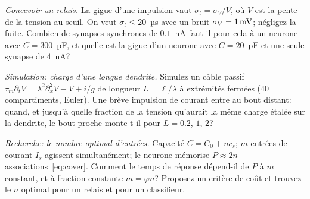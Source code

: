 \begin{exercise}[\lvlB]
\label{ex:19:5}
\emph{Concevoir un relais.} La gigue d'une impulsion vaut $\sigma_t=\sigma_V/\dot V$, où $\dot V$ est la pente de la tension au seuil. On veut $\sigma_t\le20$~µs avec un bruit $\sigma_V=1\,\text{mV}$; négligez la fuite. Combien de synapses synchrones de $0.1$~nA faut-il pour cela à un neurone avec $C=300$~pF, et quelle est la gigue d'un neurone avec $C=20$~pF et une seule synapse de $4$~nA?
\end{exercise}

\begin{exercise}[\lvlB]
\label{ex:19:6}
\emph{Simulation: charge d'une longue dendrite.} Simulez un câble passif $\tau_m\partial_tV=\lambda^2\partial_x^2V-V+i/g$ de longueur $L=\ell/\lambda$ à extrémités fermées ($40$ compartiments, Euler). Une brève impulsion de courant entre au bout distant: quand, et jusqu'à quelle fraction de la tension qu'aurait la même charge étalée sur la dendrite, le bout proche monte-t-il pour $L=0.2$, $1$, $2$?
\end{exercise}

\begin{exercise}[\lvlC]
\label{ex:19:7}
\emph{Recherche: le nombre optimal d'entrées.} Capacité $C=C_0+nc_s$; $m$ entrées de courant $I_s$ agissent simultanément; le neurone mémorise $P\approx2n$ associations~\eqref{eq:cover}. Comment le temps de réponse dépend-il de $P$ à $m$ constant, et à fraction constante $m=\varphi n$? Proposez un critère de coût et trouvez le $n$ optimal pour un relais et pour un classifieur.
\end{exercise}
